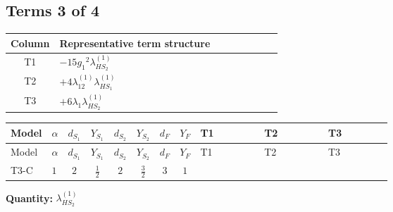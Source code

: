 \documentclass[8pt]{article}
\begin{document}
\begin{landscape}
\subsection*{Terms 3 of 4}
\begin{center}
\begin{tabular}{@{}c >{\raggedright\arraybackslash}p{0.82\linewidth}@{}}
\toprule
Column & Representative term structure \\
\midrule
T1 & \(\displaystyle -15 {g_1}^2 {\lambda_{HS_2}^{(1)}}\) \\
\midrule
T2 & \(\displaystyle +4 {\lambda_{12}^{(1)}} {\lambda_{HS_1}^{(1)}}\) \\
\midrule
T3 & \(\displaystyle +6 {\lambda_1} {\lambda_{HS_2}^{(1)}}\) \\
\midrule
\bottomrule
\end{tabular}
\end{center}
\smallskip
\tiny
\begin{longtable}{@{}llcccccc >{\raggedright\arraybackslash}p{0.21\linewidth} >{\raggedright\arraybackslash}p{0.21\linewidth} >{\raggedright\arraybackslash}p{0.21\linewidth}@{}}
\toprule
Model & $\alpha$ & $d_{S_1}$ & $Y_{S_1}$ & $d_{S_2}$ & $Y_{S_2}$ & $d_F$ & $Y_F$ & T1 & T2 & T3 \\
\midrule
\endfirsthead
\toprule
Model & $\alpha$ & $d_{S_1}$ & $Y_{S_1}$ & $d_{S_2}$ & $Y_{S_2}$ & $d_F$ & $Y_F$ & T1 & T2 & T3 \\
\midrule
\endhead
T3-C & $1$ & $2$ & $\frac{1}{2}$ & $2$ & $\frac{3}{2}$ & $3$ & $1$ & \scriptsize\adjustbox{max width=\linewidth}{$\begin{gathered} -15 {g_1}^2 {\lambda_{HS_2}^{(1)}}\end{gathered}$} & \scriptsize\adjustbox{max width=\linewidth}{$\begin{gathered} +4 {\lambda_{12}^{(1)}} {\lambda_{HS_1}^{(1)}}\end{gathered}$} & \scriptsize\adjustbox{max width=\linewidth}{$\begin{gathered} +6 {\lambda_1} {\lambda_{HS_2}^{(1)}}\end{gathered}$} \\
\midrule
\bottomrule
\end{longtable}
\clearpage
\noindent\textbf{Quantity: }$\lambda_{HS_2}^{(1)}$\par\smallskip

\end{landscape}
\end{document}
